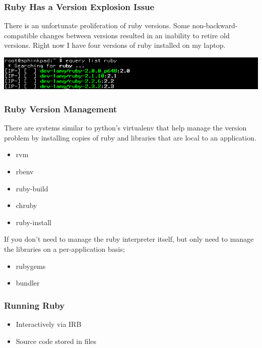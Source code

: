 \documentclass[helvetica,english,utf8,notitle,nologo]{beamer}
\begin{document}
\begin{frame}
  \frametitle{Ruby Has a Version Explosion Issue}

  There is an unfortunate proliferation of ruby versions. Some
  non-backward-compatible changes between versions resulted in an
  inability to retire old versions. Right now I have four versions of
  ruby installed on my laptop.

  \includegraphics[scale=0.5]{eselect_1}
\end{frame}

\begin{frame}
  \frametitle{Ruby Version Management}

  There are systems similar to python's virtualenv that help manage
  the version problem by installing copies of ruby and libraries that
  are local to an application.

  \begin{itemize}
  \item rvm
  \item rbenv
  \item ruby-build
  \item chruby
  \item ruby-install
  \end{itemize}

  If you don't need to manage the ruby interpreter itself, but only
  need to manage the libraries on a per-application basis;

  \begin{itemize}
  \item rubygems
  \item bundler
  \end{itemize}
\end{frame}

\begin{frame}
  \frametitle{Running Ruby}
  \begin{itemize}
  \item Interactively via IRB
  \item Source code stored in files
  \end{itemize}
\end{frame}
\end{document}
